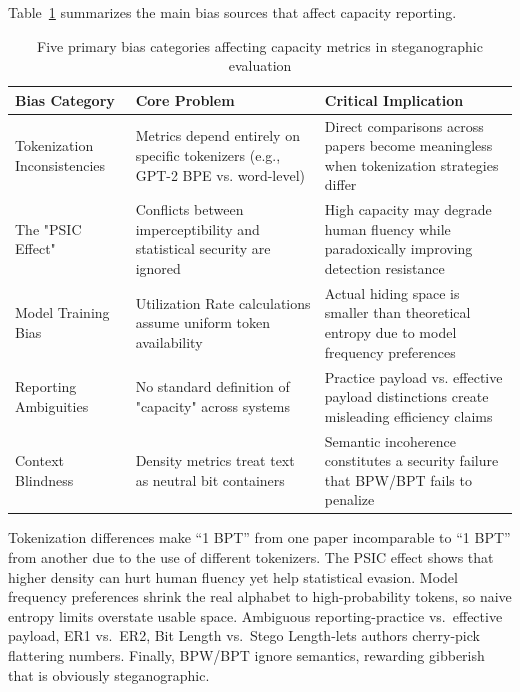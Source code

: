 Table~\ref{tab:capacity_bias_categories} summarizes the main bias sources that affect capacity reporting.

\begin{table}[t]
  \centering
  \footnotesize
  \caption{Five primary bias categories affecting capacity metrics in steganographic evaluation}
  \label{tab:capacity_bias_categories}
  \begin{tabular}{|>{\raggedright\arraybackslash}p{2cm}|>{\raggedright\arraybackslash}p{4.5cm}|>{\raggedright\arraybackslash}p{5cm}|}
    \hline
    \textbf{Bias Category}       & \textbf{Core Problem}                                                           & \textbf{Critical Implication}                                                              \\
    \hline
    Tokenization Inconsistencies & Metrics depend entirely on specific tokenizers (e.g., GPT-2 BPE vs. word-level) & Direct comparisons across papers become meaningless when tokenization strategies differ    \\
    \hline
    The "PSIC Effect"            & Conflicts between imperceptibility and statistical security are ignored         & High capacity may degrade human fluency while paradoxically improving detection resistance \\
    \hline
    Model Training Bias          & Utilization Rate calculations assume uniform token availability                 & Actual hiding space is smaller than theoretical entropy due to model frequency preferences \\
    \hline
    Reporting Ambiguities        & No standard definition of "capacity" across systems                             & Practice payload vs. effective payload distinctions create misleading efficiency claims    \\
    \hline
    Context Blindness            & Density metrics treat text as neutral bit containers                            & Semantic incoherence constitutes a security failure that BPW/BPT fails to penalize         \\
    \hline
  \end{tabular}
\end{table}

Tokenization differences make “1 BPT” from one paper incomparable to “1 BPT” from another due to the use of different tokenizers.
The PSIC effect shows that higher density can hurt human fluency yet help statistical evasion.
Model frequency preferences shrink the real alphabet to high-probability tokens, so naive entropy limits overstate usable space.
Ambiguous reporting-practice vs.\ effective payload, ER1 vs.\ ER2, Bit Length vs.\ Stego Length-lets authors cherry-pick flattering numbers.
Finally, BPW/BPT ignore semantics, rewarding gibberish that is obviously steganographic.

